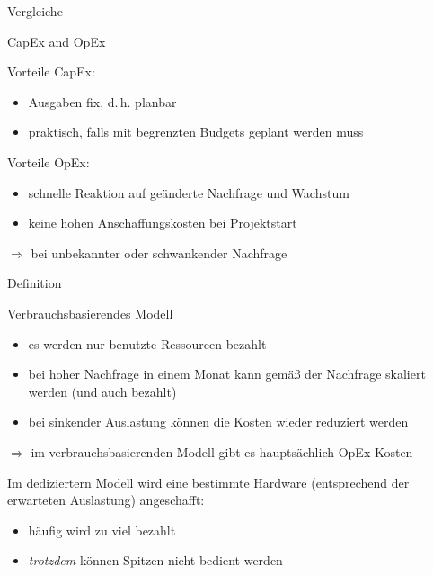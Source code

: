 \documentclass{scrartcl}
\newenvironment{flashcard}[2][]{%
    #1
    \vfill
    \centerline{\Large{#2}}
    \vfill
\newpage
}
{\newpage}
\begin{document}
    \begin{flashcard}[Vergleiche]{CapEx and OpEx}
        Vorteile CapEx:
        \begin{itemize}
            \item Ausgaben fix, d.\,h. planbar
            \item praktisch, falls mit begrenzten Budgets geplant werden muss
        \end{itemize}

        Vorteile OpEx:
        \begin{itemize}
            \item schnelle Reaktion auf geänderte Nachfrage und Wachstum
            \item keine hohen Anschaffungskosten bei Projektstart
        \end{itemize}
        $\Rightarrow$ bei unbekannter oder schwankender Nachfrage

    \end{flashcard}

    \begin{flashcard}[Definition]{Verbrauchsbasierendes Modell}
            \begin{itemize}
                \item es werden nur benutzte Ressourcen bezahlt
                \item bei hoher Nachfrage in einem Monat kann gemäß der Nachfrage skaliert werden (und auch bezahlt)
                \item bei sinkender Auslastung können die Kosten wieder reduziert werden
            \end{itemize}
            $\Rightarrow$ im verbrauchsbasierenden Modell gibt es hauptsächlich OpEx-Kosten

            \vspace{5mm}
            Im dediziertern Modell wird eine bestimmte Hardware (entsprechend der erwarteten Auslastung) angeschafft:
            \begin{itemize}
                \item häufig wird zu viel bezahlt
                \item \emph{trotzdem} können Spitzen nicht bedient werden
            \end{itemize}
    \end{flashcard}
\end{document}
